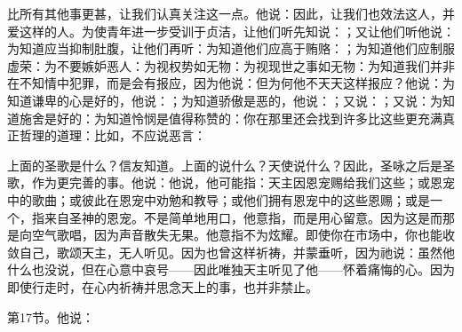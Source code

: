 比所有其他事更甚，让我们认真关注这一点。他说：因此，让我们也效法这人，并爱这样的人。为使青年进一步受训于贞洁，让他们听先知说：；又让他们听他说：为知道应当抑制肚腹，让他们再听：为知道他们应高于贿赂：；为知道他们应制服虚荣：为不要嫉妒恶人：为视权势如无物：为视现世之事如无物：为知道我们并非在不知情中犯罪，而是会有报应，因为他说：但为何他不天天这样报应？他说：为知道谦卑的心是好的，他说：；为知道骄傲是恶的，他说：；又说：；又说：为知道施舍是好的：为知道怜悯是值得称赞的：你在那里还会找到许多比这些更充满真正哲理的道理：比如，不应说恶言：\par

上面的圣歌是什么？信友知道。上面的说什么？天使说什么？因此，圣咏之后是圣歌，作为更完善的事。他说：他说，他可能指：天主因恩宠赐给我们这些；或恩宠中的歌曲；或彼此在恩宠中劝勉和教导；或他们拥有恩宠中的这些恩赐；或是一个，指来自圣神的恩宠。不是简单地用口，他意指，而是用心留意。因为这是而那是向空气歌唱，因为声音散失无果。他意指不为炫耀。即使你在市场中，你也能收敛自己，歌颂天主，无人听见。因为也曾这样祈祷，并蒙垂听，因为祂说：虽然他什么也没说，但在心意中哀号——因此唯独天主听见了他——怀着痛悔的心。因为即使行走时，在心内祈祷并思念天上的事，也并非禁止。\par

第17节。他说：\par

